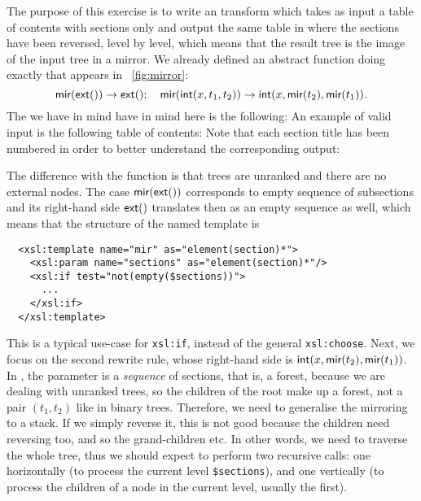 
The purpose of this exercise is to write an \XSLT transform which
takes as input a table of contents with sections only and output the
same table in \XML where the sections have been reversed, level by
level, which means that the result tree is the image of the input tree
in a mirror. We already defined an abstract function  doing
exactly that appears in \fig~\vref{fig:mirror}:
\begin{equation*}
\textsf{mir}(\textsf{ext}()) \rightarrow \textsf{ext}();
\quad
\textsf{mir}(\textsf{int}(x,t_1,t_2)) \rightarrow
\textsf{int}(x,\textsf{mir}(t_2),\textsf{mir}(t_1)).
\end{equation*}
\noindent The \DTD we have in mind have in mind here is the following:
\noindent An example of valid input is the following table of contents:
\noindent Note that each section title has been numbered in order to
better understand the corresponding output:

The difference with the function  is that \XML trees are
unranked and there are no external nodes. The case
\(\textsf{mir}(\textsf{ext}())\) corresponds to empty sequence of
subsections and its right\hyp{}hand side \(\textsf{ext}()\) translates
then as an empty sequence as well, which means that the structure of
the named template is
\begin{verbatim}
  <xsl:template name="mir" as="element(section)*">
    <xsl:param name="sections" as="element(section)*"/>
    <xsl:if test="not(empty($sections))">
      ...
    </xsl:if>
  </xsl:template>
\end{verbatim}
This is a typical use\hyp{}case for \texttt{xsl:if}, instead of the
general \texttt{xsl:choose}. Next, we focus on the second rewrite
rule, whose right\hyp{}hand side is
\(\textsf{int}(x,\textsf{mir}(t_2),\textsf{mir}(t_1))\). In \XSLT, the
parameter is a \emph{sequence} of sections, that is, a forest, because
we are dealing with unranked trees, so the children of the root make
up a forest, not a pair \((t_1, t_2)\) like in binary
trees. Therefore, we need to generalise the mirroring to a stack. If
we simply reverse it, this is not good because the children need
reversing too, and so the grand\hyp{}children etc. In other words, we
need to traverse the whole tree, thus we should expect to perform two
recursive calls: one horizontally (to process the current level
\texttt{\$sections}), and one vertically (to process the children of a
node in the current level, usually the first).

